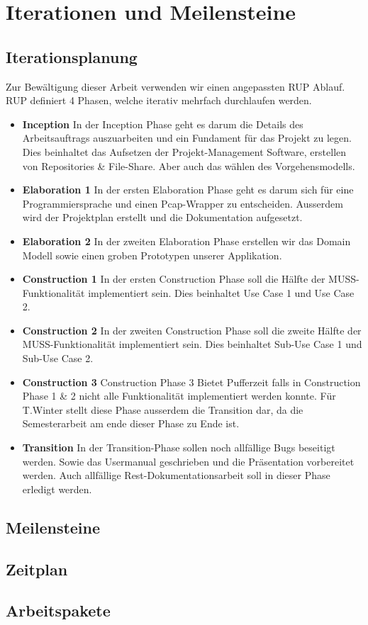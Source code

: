\section{Iterationen und Meilensteine}
\label{sec:Iterationen und Meilensteine}

\subsection{Iterationsplanung}
Zur Bewältigung dieser Arbeit verwenden wir einen angepassten \acl{RUP} Ablauf. \acs{RUP} definiert 4 Phasen, welche iterativ mehrfach durchlaufen werden.

\begin{itemize}
  \item \textbf{Inception} \newline In der Inception Phase geht es darum die Details des Arbeitsauftrags auszuarbeiten und ein Fundament für das Projekt zu legen. Dies beinhaltet das Aufsetzen der Projekt-Management Software, erstellen von Repositories \& File-Share. Aber auch das wählen des Vorgehensmodells.
  \item \textbf{Elaboration 1} \newline In der ersten Elaboration Phase geht es darum sich für eine Programmiersprache und einen Pcap-Wrapper zu entscheiden. Ausserdem wird der Projektplan erstellt und die Dokumentation aufgesetzt.
  \item \textbf{Elaboration 2} \newline In der zweiten Elaboration Phase erstellen wir das Domain Modell sowie einen groben Prototypen unserer Applikation.
  \item \textbf{Construction 1} \newline In der ersten Construction Phase soll die Hälfte der MUSS-Funktionalität implementiert sein. Dies beinhaltet Use Case 1 und Use Case 2.
  \item \textbf{Construction 2} \newline In der zweiten Construction Phase soll die zweite Hälfte der MUSS-Funktionalität implementiert sein. Dies beinhaltet Sub-Use Case 1 und Sub-Use Case 2.
  \item \textbf{Construction 3} \newline Construction Phase 3 Bietet Pufferzeit falls in Construction Phase 1 \& 2 nicht alle Funktionalität implementiert werden konnte. Für T.Winter stellt diese Phase ausserdem die Transition dar, da die Semesterarbeit am ende dieser Phase zu Ende ist.
  \item \textbf{Transition} \newline In der Transition-Phase sollen noch allfällige Bugs beseitigt werden. Sowie das Usermanual geschrieben und die Präsentation vorbereitet werden. Auch allfällige Rest-Dokumentationsarbeit soll in dieser Phase erledigt werden.
\end{itemize}

\subsection{Meilensteine}

\subsection{Zeitplan}

\subsection{Arbeitspakete}